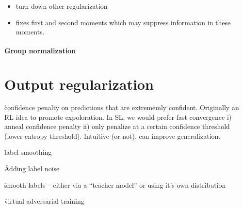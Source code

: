 \begin{itemize}[noitemsep,topsep=0pt]
	\item turn down other regularization
	\item fixes first and second moments which may suppress information in these moments.
\end{itemize}



\paragraph{Group normalization}



\section{Output regularization}

\r{confidence penalty on predictions that are extrememly confident\cite{pereyra2017regularizing}. Originally an RL idea to promote expoloration. In SL, we would prefer fast convergence i) anneal confidence penalty ii) only penalize at a certain confidence threshold (lower entropy threshold). Intuitive (or not), can improve generalization.}

\r{label smoothing\cite{szegedy2016rethinking}}

\r{Adding label noise\cite{xie2016disturblabel}}

\r{smooth labels -- either via a ``teacher model''\cite{hinton2015distilling} or using it's own distribution\cite{reed2014training}}

\r{virtual adversarial training\cite{miyato2018virtual}}